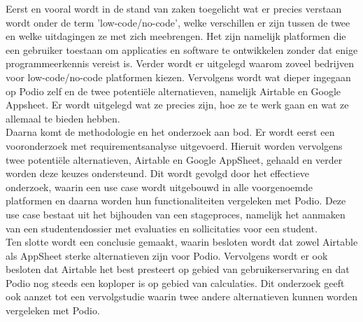Eerst en vooral wordt in de stand van zaken toegelicht wat er precies verstaan wordt onder de term 'low-code/no-code', welke verschillen er zijn tussen de twee en welke uitdagingen ze met zich meebrengen. Het zijn namelijk platformen die een gebruiker toestaan om applicaties en software te ontwikkelen zonder dat enige programmeerkennis vereist is. Verder wordt er uitgelegd waarom zoveel bedrijven voor low-code/no-code platformen kiezen. Vervolgens wordt wat dieper ingegaan op Podio zelf en de twee potentiële alternatieven, namelijk Airtable en Google Appsheet. Er wordt uitgelegd wat ze precies zijn, hoe ze te werk gaan en wat ze allemaal te bieden hebben. \\

Daarna komt de methodologie en het onderzoek aan bod. Er wordt eerst een vooronderzoek met requirementsanalyse uitgevoerd. Hieruit worden vervolgens twee potentiële alternatieven, Airtable en Google AppSheet, gehaald en verder worden deze keuzes ondersteund. Dit wordt gevolgd door het effectieve onderzoek, waarin een use case wordt uitgebouwd in alle voorgenoemde platformen en daarna worden hun functionaliteiten vergeleken met Podio. Deze use case bestaat uit het bijhouden van een stageproces, namelijk het aanmaken van een studentendossier met evaluaties en sollicitaties voor een student. \\ 

Ten slotte wordt een conclusie gemaakt, waarin besloten wordt dat zowel Airtable als AppSheet sterke alternatieven zijn voor Podio. Vervolgens wordt er ook besloten dat Airtable het best presteert op gebied van gebruikerservaring en dat Podio nog steeds een koploper is op gebied van calculaties. Dit onderzoek geeft ook aanzet tot een vervolgstudie waarin twee andere alternatieven kunnen worden vergeleken met Podio. \\

